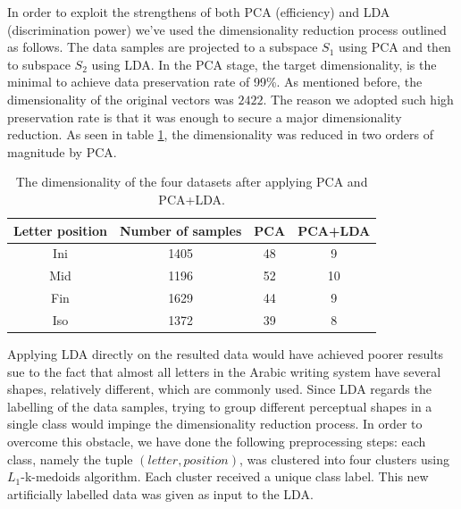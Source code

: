\iftoggle{edit-mode}{\hspace{0pt}\marginpar{Implementation: PCA}}{}
In order to exploit the strengthens of both PCA (efficiency) and LDA (discrimination power) we've used the dimensionality reduction process outlined as follows. 
The data samples are projected to a subspace $S_1$ using PCA and then to subspace $S_2$ using LDA. 
In the PCA stage, the target dimensionality, is the minimal to achieve data preservation rate of 99\%. 
As mentioned before, the dimensionality of the original vectors was $2422$. 
The reason we adopted such high preservation rate is that it was enough to secure a major dimensionality reduction. 
As seen in table \ref{table:dr_dimensions_results}, the dimensionality was reduced in two orders of magnitude by PCA.

\begin{table}
\centering
\caption{The dimensionality of the four datasets after applying PCA and PCA+LDA.}
\begin{tabular}{ | c | c | c | c |}
\hline
\textbf{Letter position} & \textbf{Number of samples} & \textbf{PCA} & \textbf{PCA+LDA} \\
\hline                 
  Ini & 1405 & 48 & 9 \\ 
  \hline
  Mid & 1196 & 52 & 10 \\ 
  \hline
  Fin & 1629 & 44 & 9 \\ 
  \hline
  Iso & 1372 & 39 & 8 \\ 
  \hline
\end{tabular}
\label{table:dr_dimensions_results} 
\end{table}

\iftoggle{edit-mode}{\hspace{0pt}\marginpar{Implementation: Clustering and LDA}}{}
Applying LDA directly on the resulted data would have achieved poorer results sue to the fact that almost all letters in the Arabic writing system have several shapes, relatively different, which are commonly used. 
Since LDA regards the labelling of the data samples, trying to group different perceptual shapes in a single class would impinge the dimensionality reduction process. 
In order to overcome this obstacle, we have done the following preprocessing steps: each class, namely the tuple $(letter, position)$, was clustered into four clusters using $L_1$-k-medoids algorithm. 
Each cluster received a unique class label. 
This new artificially labelled data was given as input to the LDA.

